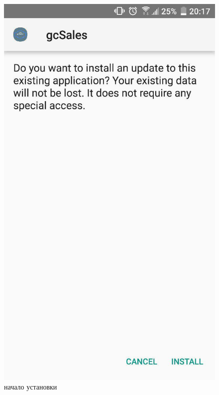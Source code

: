 \begin{figure}[h!]
    \centering
    \includegraphics[height=0.38\textheight]{./screenshots/3/install_1.jpg}
    \caption{\small{начало установки}}
    \label{install1}
    \endminipage\hfill

\end{figure}
